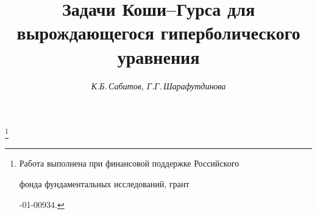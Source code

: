 




%





\newcommand{\sgn}{\operatorname{sgn}}


\newcommand{\re}{\operatorname{Re}}


\newcommand{\tts}[1]{}


\renewcommand{\baselinestretch}{0.97}







\setcounter{page}{21}















\author{\it К.Б.\,Сабитов, Г.Г.\,Шарафутдинова}




\title{Задачи Коши--Гурса для вырождающегося гиперболического уравнения}


\thanks{Работа выполнена при финансовой поддержке Российского 


фонда фундаментальных исследований, грант 


-01-00934.}





\date{}




\pagestyle{plain} %







